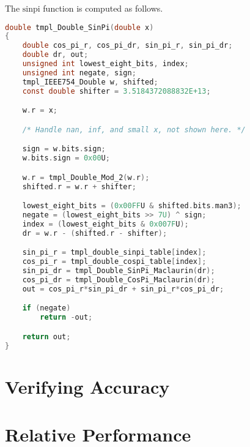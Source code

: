 \documentclass{article}
\theoremstyle{plain}
\begin{document}
        The $\textrm{sinpi}$ function is computed as follows.
        \begin{mdframed}
            \begin{lstlisting}[language={C}]
double tmpl_Double_SinPi(double x)
{
    double cos_pi_r, cos_pi_dr, sin_pi_r, sin_pi_dr;
    double dr, out;
    unsigned int lowest_eight_bits, index;
    unsigned int negate, sign;
    tmpl_IEEE754_Double w, shifted;
    const double shifter = 3.5184372088832E+13;

    w.r = x;

    /* Handle nan, inf, and small x, not shown here. */

    sign = w.bits.sign;
    w.bits.sign = 0x00U;

    w.r = tmpl_Double_Mod_2(w.r);
    shifted.r = w.r + shifter;

    lowest_eight_bits = (0x00FFU & shifted.bits.man3);
    negate = (lowest_eight_bits >> 7U) ^ sign;
    index = (lowest_eight_bits & 0x007FU);
    dr = w.r - (shifted.r - shifter);

    sin_pi_r = tmpl_double_sinpi_table[index];
    cos_pi_r = tmpl_double_cospi_table[index];
    sin_pi_dr = tmpl_Double_SinPi_Maclaurin(dr);
    cos_pi_dr = tmpl_Double_CosPi_Maclaurin(dr);
    out = cos_pi_r*sin_pi_dr + sin_pi_r*cos_pi_dr;

    if (negate)
        return -out;

    return out;
}
            \end{lstlisting}
        \end{mdframed}

    \section{Verifying Accuracy}
    \section{Relative Performance}
    
    
\end{document}
